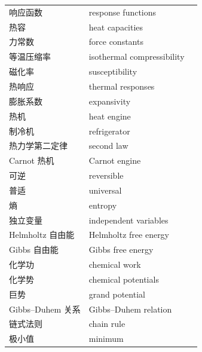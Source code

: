 \begin{xltabular}{\textwidth}{@{}l l c@{}}
  响应函数 & {\glossaryfont response functions} & \pageref{term:1.response} \\
  热容 & {\glossaryfont heat capacities} & \pageref{term:1.heat-cap} \\
  力常数 & {\glossaryfont force constants} & \pageref{term:1.force-const} \\
  等温压缩率 & {\glossaryfont isothermal compressibility} & \pageref{term:1.kappa} \\
  磁化率 & {\glossaryfont susceptibility} & \pageref{term:1.chi} \\
  热响应 & {\glossaryfont thermal responses} & \pageref{term:1.thermal-resp} \\
  膨胀系数 & {\glossaryfont expansivity} & \pageref{term:1.alpha} \\
  热机 & {\glossaryfont heat engine} & \pageref{term:1.heat-engine} \\
  制冷机 & {\glossaryfont refrigerator} & \pageref{term:1.refrigerator} \\
  热力学第二定律 & {\glossaryfont second law} & \pageref{term:1.second-law} \\
  Carnot 热机 & {\glossaryfont Carnot engine} & \pageref{term:1.carnot} \\
  可逆 & {\glossaryfont reversible} & \pageref{term:1.reversible} \\
  普适 & {\glossaryfont universal} & \pageref{term:1.universal} \\
  熵 & {\glossaryfont entropy} & \pageref{term:1.entropy} \\
  独立变量 & {\glossaryfont independent variables} & \pageref{term:1.indep-var} \\
  Helmholtz 自由能 & {\glossaryfont Helmholtz free energy} & \pageref{term:1.helmholtz} \\
  Gibbs 自由能 & {\glossaryfont Gibbs free energy} & \pageref{term:1.gibbs-free} \\
  化学功 & {\glossaryfont chemical work} & \pageref{term:1.chem-work} \\
  化学势 & {\glossaryfont chemical potentials} & \pageref{term:1.chem-pot} \\
  巨势 & {\glossaryfont grand potential} & \pageref{term:1.grand-potential} \\
  Gibbs--Duhem 关系 & {\glossaryfont Gibbs--Duhem relation} & \pageref{term:1.gibbs-duhem} \\
  链式法则 & {\glossaryfont chain rule} & \pageref{term:1.chain-rule} \\
  极小值 & {\glossaryfont minimum} & \pageref{term:1.minimum} \\

\end{xltabular}
